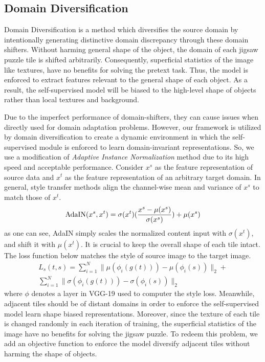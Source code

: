\documentclass[10pt,twocolumn,letterpaper]{article}
\begin{document}
\subsection{Domain Diversification}
Domain Diversification is a method which diversifies the source domain by intentionally generating distinctive domain discrepancy through these domain shifters.
Without harming general shape of the object, the domain of each jigsaw puzzle tile is shifted arbitrarily.
Consequently, superficial statistics of the image like textures, have no benefits for solving the pretext task. Thus, the model is enforced to extract features relevant to the general shape of each object. As a result, the self-supervised model will be biased to the high-level shape of objects rather than local textures and background.

Due to the imperfect performance of domain-shifters, they can cause issues when directly used for domain adaptation problems. However, our framework is utilized by domain diversification to create a dynamic environment in which the self-supervised module is enforced to learn domain-invariant representations. So, we use a modification of \textit{Adaptive Instance Normalization} method due to its high speed and acceptable performance.
Consider $x^s$ as the feature representation of source data and $x^t$ as the feature representation of an arbitrary target domain. In general, style transfer methods align the channel-wise mean and variance of $x^s$ to match those of $x^t$.
\begin{equation}
	\textnormal{AdaIN}(x^s, x^t) = \sigma(x^t)(\frac{x^s - \mu(x^s)}{\sigma(x^s)}) +
	\mu(x^s)
\end{equation}\label{eq3}
as one can see, AdaIN simply scales the normalized content input with $\sigma(x^t)$, and shift it with $\mu(x^t)$. It is crucial to keep the overall shape of each tile intact. The loss function below matches the style of source image to the target image.
\begin{multline}
L_s(t, s) = \sum_{i = 1}^{N}\|\mu(\phi_i(g(t))) - \mu(\phi_i(s))\|_2 +\\ 
\sum_{i = 1}^{N}\|\sigma(\phi_i(g(t))) - \sigma(\phi_i(s))\|_2
\end{multline}
where $\phi$ denotes a layer in VGG-19 used to computer the style loss. Meanwhile, adjacent tiles should be of distant domains in order to enforce the self-supervised model learn shape biased representations.
Moreover, since the texture of each tile is changed randomly in each iteration of training, the superficial statistics of the image have no benefits for solving the jigsaw puzzle. To redeem this problem, we add an objective function to enforce the model diversify adjacent tiles without harming the shape of objects.
\end{document}
